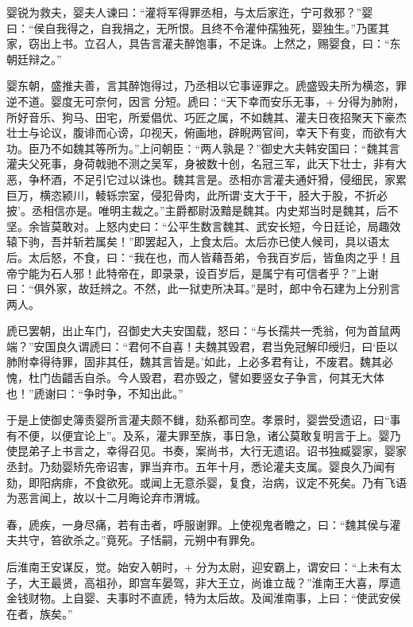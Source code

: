 \documentclass[12pt,UTF8]{ctexbook}
\begin{document}
婴锐为救夫，婴夫人谏曰：“灌将军得罪丞相，与太后家迕，宁可救邪？”婴曰：“侯自我得之，自我捐之，无所恨。且终不令灌仲孺独死，婴独生。”乃匿其家，窃出上书。立召人，具告言灌夫醉饱事，不足诛。上然之，赐婴食，曰：“东朝廷辩之。”



婴东朝，盛推夫善，言其醉饱得过，乃丞相以它事诬罪之。虒盛毁夫所为横恣，罪逆不道。婴度无可奈何，因言分短。虒曰：“天下幸而安乐无事，+分得为肺附，所好音乐、狗马、田宅，所爱倡优、巧匠之属，不如魏其、灌夫日夜招聚天下豪杰壮士与论议，腹诽而心谤，卬视天，俯画地，辟睨两官间，幸天下有变，而欲有大功。臣乃不如魏其等所为。”上问朝臣：“两人孰是？”御史大夫韩安国曰：“魏其言灌夫父死事，身荷戟驰不测之吴军，身被数十创，名冠三军，此天下壮士，非有大恶，争杯酒，不足引它过以诛也。魏其言是。丞相亦言灌夫通奸猾，侵细民，家累巨万，横恣颍川，輘轹宗室，侵犯骨肉，此所谓‘支大于干，胫大于股，不折必披’。丞相信亦是。唯明主裁之。”主爵都尉汲黯是魏其。内史郑当时是魏其，后不坚。余皆莫敢对。上怒内史曰：“公平生数言魏其、武安长短，今日廷论，局趣效辕下驹，吾并斩若属矣！”即罢起入，上食太后。太后亦已使人候司，具以语太后。太后怒，不食，曰：“我在也，而人皆藉吾弟，令我百岁后，皆鱼肉之乎！且帝宁能为石人邪！此特帝在，即录录，设百岁后，是属宁有可信者乎？”上谢曰：“俱外家，故廷辨之。不然，此一狱吏所决耳。”是时，郎中令石建为上分别言两人。



虒已罢朝，出止车门，召御史大夫安国载，怒曰：“与长孺共一秃翁，何为首鼠两端？”安国良久谓虒曰：“君何不自喜！夫魏其毁君，君当免冠解印绶归，曰‘臣以肺附幸得待罪，固非其任，魏其言皆是。’如此，上必多君有让，不废君。魏其必愧，杜门齿齰舌自杀。今人毁君，君亦毁之，譬如要竖女子争言，何其无大体也！”虒谢曰：“争时争，不知出此。”



于是上使御史簿责婴所言灌夫颇不雠，劾系都司空。孝景时，婴尝受遗诏，曰“事有不便，以便宜论上”。及系，灌夫罪至族，事日急，诸公莫敢复明言于上。婴乃使昆弟子上书言之，幸得召见。书奏，案尚书，大行无遗诏。诏书独臧婴家，婴家丞封。乃劾婴矫先帝诏害，罪当弃市。五年十月，悉论灌夫支属。婴良久乃闻有劾，即阳病痱，不食欲死。或闻上无意杀婴，复食，治病，议定不死矣。乃有飞语为恶言闻上，故以十二月晦论弃市渭城。



春，虒疾，一身尽痛，若有击者，呼服谢罪。上使视鬼者瞻之，曰：“魏其侯与灌夫共守，笞欲杀之。”竟死。子恬嗣，元朔中有罪免。



后淮南王安谋反，觉。始安入朝时，+分为太尉，迎安霸上，谓安曰：“上未有太子，大王最贤，高祖孙，即宫车晏驾，非大王立，尚谁立哉？”淮南王大喜，厚遗金钱财物。上自婴、夫事时不直虒，特为太后故。及闻淮南事，上曰：“使武安侯在者，族矣。”
\end{document}
